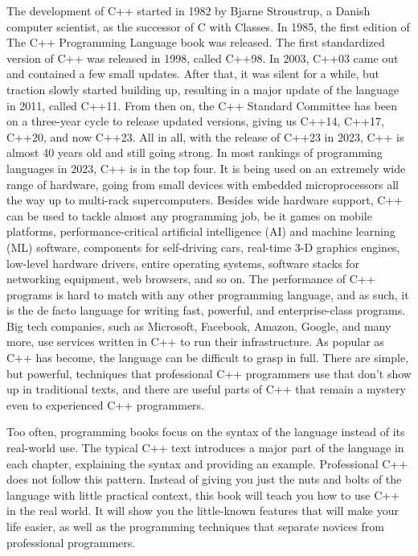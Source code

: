 
The development of C++ started in 1982 by Bjarne Stroustrup, a Danish computer scientist, as the successor of C with Classes. In 1985, the first edition of The C++ Programming Language book was released. The first standardized version of C++ was released in 1998, called C++98. In 2003, C++03 came out and contained a few small updates. After that, it was silent for a while, but traction slowly started building up, resulting in a major update of the language in 2011, called C++11. From then on, the C++ Standard Committee has been on a three-year cycle to release updated versions, giving us C++14, C++17, C++20, and now C++23. All in all, with the release of C++23 in 2023, C++ is almost 40 years old and still going strong. In most rankings of programming languages in 2023, C++ is in the top four. It is being used on an extremely wide range of hardware, going from small devices with embedded microprocessors all the way up to multi-rack supercomputers. Besides wide hardware support, C++ can be used to tackle almost any programming job, be it games on mobile platforms, performance-critical artificial intelligence (AI) and machine learning (ML) software, components for self-driving cars, real-time 3-D graphics engines, low-level hardware drivers, entire operating systems, software stacks for networking equipment, web browsers, and so on. The performance of C++ programs is hard to match with any other programming language, and as such, it is the de facto language for writing fast, powerful, and enterprise-class programs. Big tech companies, such as Microsoft, Facebook, Amazon, Google, and many more, use services written in C++ to run their infrastructure. As popular as C++ has become, the language can be difficult to grasp in full. There are simple, but powerful, techniques that professional C++ programmers use that don’t show up in traditional texts, and there are useful parts of C++ that remain a mystery even to experienced C++ programmers.

Too often, programming books focus on the syntax of the language instead of its real-world use. The typical C++ text introduces a major part of the language in each chapter, explaining the syntax and providing an example. Professional C++ does not follow this pattern. Instead of giving you just the nuts and bolts of the language with little practical context, this book will teach you how to use C++ in the real world. It will show you the little-known features that will make your life easier, as well as the programming techniques that separate novices from professional programmers.

